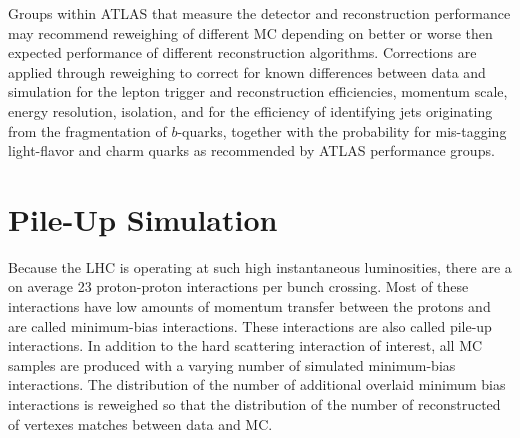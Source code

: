 \indent Groups within ATLAS that measure the detector and reconstruction performance may recommend reweighing of different MC depending on better or worse then expected performance of different reconstruction algorithms. Corrections are applied through reweighing to correct for known differences between data and simulation for the lepton trigger and reconstruction efficiencies, momentum scale, energy resolution, isolation, and for the efficiency of identifying jets originating from the fragmentation of $b$-quarks, together with the probability for mis-tagging light-flavor and charm quarks as recommended by ATLAS performance groups. \\

\section{Pile-Up Simulation}
\label{sec:MC:PileUp}

\indent Because the LHC is operating at such high instantaneous luminosities, there are a on average 23 proton-proton interactions per bunch crossing.  Most of these interactions have low amounts of momentum transfer between the protons and are called minimum-bias interactions.  These interactions are also called pile-up interactions.  In addition to the hard scattering interaction of interest, all MC samples are produced with a varying number of simulated minimum-bias interactions.  The distribution of the number of additional overlaid minimum bias interactions is reweighed so that the distribution of the number of reconstructed of vertexes matches between data and MC.  \\


